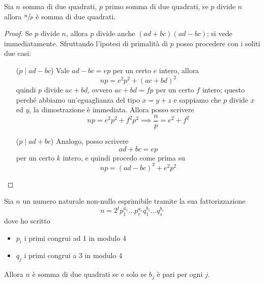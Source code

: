 \begin{lemma}
	Sia $n$ somma di due quadrati, $p$ primo somma di due quadrati, se $p$ divide $n$ allora $\sfrac{n}{p}$ è somma di due quadrati.
\end{lemma}
\begin{proof}
	Se $p$ divide $n$, allora $p$ divide anche $(ad+bc)(ad-bc)$; si vede immediatamente. Sfruttando l'ipotesi di primalità di $p$ posso procedere con i soliti due casi:
	\begin{itemize}
		\item[($p\mid ad-bc$)] Vale $ad-bc=ep$ per un certo $e$ intero, allora 
		\begin{equation*}
		np=e^2p^2+(ac+bd)^2
		\end{equation*}
		quindi $p$ divide $ac+bd$, ovvero $ac+bd=fp$ per un certo $f$ intero; questo perché abbiamo un'eguaglianza del tipo $x=y+z$ e sappiamo che $p$ divide $x$ ed $y$, la dimostrazione è immediata. Allora posso scrivere 
		\begin{equation*}
		np=e^2p^2+f^2p^2\implies\frac{n}{p}=e^2+f^2
		\end{equation*}
		\item[($p\mid ad+bc$)] Analogo, posso scrivere 
		\begin{equation*}
		ad+bc=ep
		\end{equation*}
		per un certo $k$ intero, e quindi procedo come prima su
		\begin{equation*}
		np=(ad-bc)^2+e^2p^2
		\end{equation*}
	\end{itemize}
\end{proof}
\begin{teorema} 
	Sia $n$ un numero naturale non-nullo esprimibile tramite la sua fattorizzazione
	\begin{equation*}
	n=2^tp_1^{a_1}\dots p_r^{a_r}q_1^{b_1}\dots q_s^{b_s}
	\end{equation*}
	dove ho scritto
	\begin{itemize}
		\item $p_i$ i primi congrui ad 1 in modulo 4
		\item $q_j$ i primi congrui a 3 in modulo 4 
	\end{itemize}
	Allora $n$ è somma di due quadrati se e solo se $b_j$ è pari per ogni $j$.
\end{teorema}
